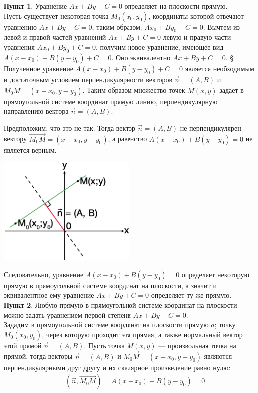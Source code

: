\documentclass[12pt, fleqn]{extarticle}
\begin{document}
\textbf{Пункт 1}. Уравнение \(Ax + By + C = 0\) определяет на плоскости прямую. \\

Пусть существует некоторая точка \(M_0(x_0, y_0)\), координаты которой отвечают уравнению \(Ax + By + C = 0\), таким образом: \(Ax_0 + By_0 + C = 0\).
Вычтем из левой и правой частей уравнений \(Ax + By + C = 0\) левую и правую части уравнения \(Ax_0 + By_0 + C = 0\), получим новое уравнение, имеющее вид \(A(x - x_0) + B(y - y_0) + C = 0\).
Оно эквивалентно \(Ax + By + C = 0\).
§
Полученное уравнение \(A(x - x_0) + B(y - y_0) + C = 0\) является необходимым и достаточным условием перпендикулярности векторов \(\overrightarrow{n} = (A, B)\) и \(\overrightarrow{M_0M} = (x - x_0, y - y_0)\).
Таким образом множество точек \(M(x, y)\) задает в прямоугольной системе координат прямую линию, перпендикулярную направлению вектора \(\overrightarrow{n} = (A, B)\).

Предположим, что это не так. Тогда вектор \(\overrightarrow{n} = (A, B)\) не перпендикулярен вектору \(\overrightarrow{M_0M} = (x - x_0, y - y_0)\), а равенство \(A(x - x_0) + B(y - y_0) = 0\) не является верным.

\begin{center}
    \includegraphics[width=0.5\textwidth]{general_line.png}
\end{center}

Следовательно, уравнение \(A(x - x_0) + B(y - y_0) = 0\) определяет некоторую прямую в прямоугольной системе координат на плоскости, а значит и эквивалентное ему уравнение \(Ax + By + C = 0\) определяет ту же прямую. \\

\textbf{Пункт 2}. Любую прямую в прямоугольной системе координат на плоскости можно задать уравнением первой степени \(Ax + By + C = 0\). \\

Зададим в прямоугольной системе координат на плоскости прямую \(a \); точку \(M_0(x_0, y_0)\), через которую проходит эта прямая, а также нормальный вектор этой прямой \(\overrightarrow{n} = (A, B)\).
Пусть точка \(M(x, y)\) — произвольная точка на прямой, тогда векторы \(\overrightarrow{n} = (A, B)\) и \(\overrightarrow{M_0M} = (x - x_0, y - y_0)\) являются перпендикулярными друг другу и их скалярное произведение равно нулю:
\begin{align*}
     &  &
    (\overrightarrow{n}, \overrightarrow{M_0M}) = A(x - x_0) + B(y - y_0) = 0
\end{align*}
\end{document}
